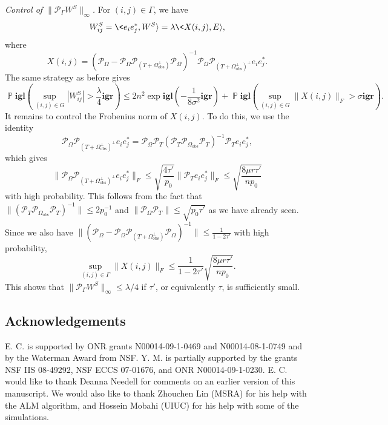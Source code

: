 {\em Control of $\|\mathcal{P}_\Gamma W^S\|_\infty$.} For $(i,j) \in \Gamma$, we have 
\[
W^S_{ij} = \<e_i e_j^*, W^S\rangle = \lambda \<X(i,j), E\rangle,
\]
where 
\[
X(i,j) = (\mathcal{P}_{\Omega} - \mathcal{P}_{\Omega} \mathcal{P}_{(T + \Omega_{\text{obs}}^\perp)} \mathcal{P}_{\Omega})^{-1} \mathcal{P}_{\Omega} \mathcal{P}_{(T + \Omega_{\text{obs}}^\perp)^\perp} e_i e_j^*. 
\]
The same strategy as before gives
\[
\operatorname{\mathbb{P}}\mathbf{igl}(\sup_{(i,j) \in G} |W^S_{ij}| > \frac{\lambda}{4} \mathbf{igr}) \le 2n^2
\exp\mathbf{igl}(-\frac{1}{8\sigma^2}\mathbf{igr}) + \operatorname{\mathbb{P}}\mathbf{igl}(\sup_{(i,j) \in G}
\|X(i,j)\|_F > \sigma\mathbf{igr}).
\]
It remains to control the Frobenius norm of $X(i,j)$. To do this, we use the identity
\[
\mathcal{P}_{\Omega} \mathcal{P}_{(T + \Omega_{\text{obs}}^\perp)^\perp} e_i e_j^* = \mathcal{P}_{\Omega} \mathcal{P}_T  (\mathcal{P}_T \mathcal{P}_{\Omega_{\text{obs}}} \mathcal{P}_T)^{-1} \mathcal{P}_T e_ie_j^*,
\]
which gives
\[
\|\mathcal{P}_{\Omega} \mathcal{P}_{(T + \Omega_{\text{obs}}^\perp)^\perp} e_i e_j^*\|_F \le \sqrt{\frac{4 \tau'}{p_0}} \|\mathcal{P}_T e_i
e_j^*\|_F \le \sqrt{\frac{8 \mu r \tau'}{np_0}}
\]
with high probability. This follows from the fact that $\|(\mathcal{P}_T \mathcal{P}_{\Omega_{\text{obs}}}
\mathcal{P}_T)^{-1}\| \le 2p_0^{-1}$ and $\|\mathcal{P}_{\Omega} \mathcal{P}_T\| \le \sqrt{p_0 \tau'}$ as we have already seen. Since we also have $\|(\mathcal{P}_{\Omega} - \mathcal{P}_{\Omega} \mathcal{P}_{(T + \Omega_{\text{obs}}^\perp)}
\mathcal{P}_{\Omega})^{-1}\| \le \frac{1}{1-2\tau'}$ with high probability,
\[
\sup_{(i,j) \in \Gamma} \|X(i,j)\|_F \le \frac{1}{1-2\tau'}
\sqrt{\frac{8 \mu r \tau'}{np_0}}. 
\]
This shows that $\|\mathcal{P}_\Gamma W^S\|_\infty \le \lambda/4$ if $\tau'$, or equivalently $\tau$, is sufficiently small.

\subsection*{Acknowledgements}

E. C. is supported by ONR grants N00014-09-1-0469 and N00014-08-1-0749 and by the Waterman Award from NSF. Y. M. is partially supported by the grants NSF IIS 08-49292, NSF ECCS 07-01676, and ONR N00014-09-1-0230. E. C. would like to thank Deanna Needell for comments on an earlier version of this manuscript.  We would also like to thank Zhouchen Lin (MSRA) for his help with the ALM algorithm, and Hossein Mobahi (UIUC) for his help with some of the simulations. 

\small 



